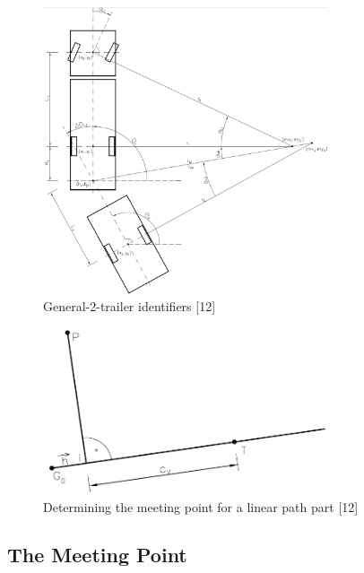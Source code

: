 \begin{figure}[h]
\centering
\includegraphics[width=0.75\textwidth]{./Chapters/Figures/vehicle_kinematic.png}
\caption{General-2-trailer identifiers [12] \label{pic:vehicle_kinematic}}
\end{figure}

\begin{figure}[h]
\centering
\includegraphics[width=0.75\textwidth]{./Chapters/Figures/meeting_point_linear.png}
\caption{Determining the meeting point for a linear path part [12] \label{pic:meeting_point_linear}}
\end{figure}

\subsection{The Meeting Point}
\label{sec:meeting_point}

